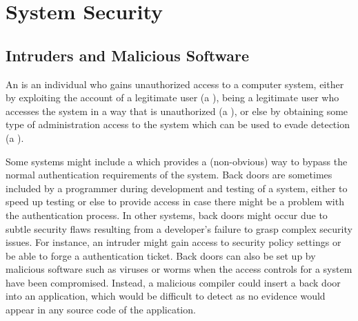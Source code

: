 
\chapter{System Security}


\section{Intruders and Malicious Software}


An  is an individual who gains unauthorized access to a computer system,
either by exploiting the account of a legitimate user (a ), being
a legitimate user who accesses the system in a way that is unauthorized
(a ), or else by obtaining some type of administration access to the
system which can be used to evade detection (a ).

Some systems might include a  which provides a (non-obvious) way to bypass
the normal authentication requirements of the system.
Back doors are sometimes included by a programmer during development and testing of a system,
either to speed up testing or else to provide access in case there might be a problem with
the authentication process.
In other systems, back doors might occur due to subtle security flaws resulting from
a developer's failure to grasp complex security issues.
For instance, an intruder might gain access to security policy settings or
be able to forge a authentication ticket.
Back doors can also be set up by malicious software such as viruses or worms
when the access controls for a system have been compromised.
Instead, a malicious compiler could insert a back door into an application, which would be
difficult to detect as no evidence would appear in any source code of the application.

